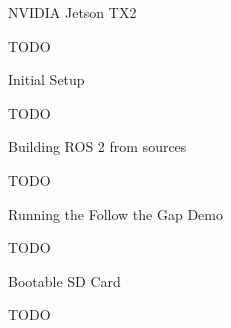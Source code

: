 \chap NVIDIA Jetson TX2

TODO


\sec Initial Setup

TODO


\sec Building ROS 2 from sources

TODO


\sec Running the Follow the Gap Demo

TODO


\sec Bootable SD Card

TODO
